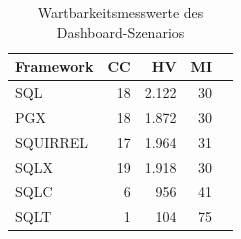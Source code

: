 \begin{table}[ht]
\centering
\caption{Wartbarkeitsmesswerte des Dashboard-Szenarios}
\begin{tabular}{lrrrr}
\toprule
Framework & CC & HV & MI \\
\midrule
	SQL & 18 & 2.122 & 30 \\
	PGX & 18 & 1.872 & 30 \\
	SQUIRREL & 17 & 1.964 & 31 \\
	SQLX & 19 & 1.918 & 30 \\
	SQLC & 6 & 956 & 41 \\
	SQLT & 1 & 104 & 75 \\
\bottomrule
\end{tabular}
\label{tab:wartbarkeit_dashboard}
\end{table}
	